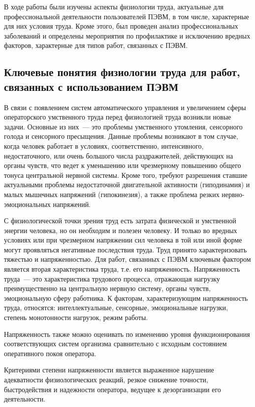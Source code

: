 В ходе работы были изучены аспекты физиологии труда, актуальные для профессиональной деятельности пользователей ПЭВМ, в том числе, характерные для них условия труда. Кроме этого, был проведен анализ профессиональных заболеваний и определены мероприятия по профилактике и исключению вредных факторов, характерные для типов работ, связанных с ПЭВМ.

\subsection{Ключевые понятия физиологии труда для работ, связанных с использованием ПЭВМ}
В связи с появлением систем автоматического управления и увеличением сферы операторского умственного труда перед физиологией труда возникли новые задачи. Основные из них~--- это проблемы умственного утомления, сенсорного голода и сенсорного пресыщения. Данные проблемы возникают в том случае, когда человек работает в условиях, соответственно, интенсивного, недостаточного, или очень большого числа раздражителей, действующих на органы чувств, что ведет к уменьшению или чрезмерному повышению общего тонуса центральной нервной системы. Кроме того, требуют разрешения ставшие актуальными проблемы недостаточной двигательной активности (гиподинамия) и малых мышечных напряжений (гипокинезия), а также проблема резких нервно-эмоциональных напряжений.

С физиологической точки зрения труд есть затрата физической и умственной энергии человека, но он необходим и полезен человеку. И только во вредных условиях или при чрезмерном напряжении сил человека в той или иной форме могут проявляться негативные последствия труда. Труд принято характеризовать тяжестью и напряженностью. Для работ, связанных с ПЭВМ ключевым фактором является вторая характеристика труда, т.е. его напряженность.
Напряженность труда~--- это характеристика трудового процесса, отражающая нагрузку преимущественно на центральную нервную систему, органы чувств, эмоциональную сферу работника. К факторам, характеризующим напряженность труда, относятся: интеллектуальные, сенсорные, эмоциональные нагрузки, степень монотонности нагрузок, режим работы.

Напряженность также можно оценивать по изменению уровня функционирования соответствующих систем организма сравнительно с исходным состоянием оперативного покоя оператора.

Критериями степени напряженности является выраженное нарушение адекватности физиологических реакций, резкое снижение точности, быстродействия и надежности оператора, ведущее к дезорганизации его деятельности.


